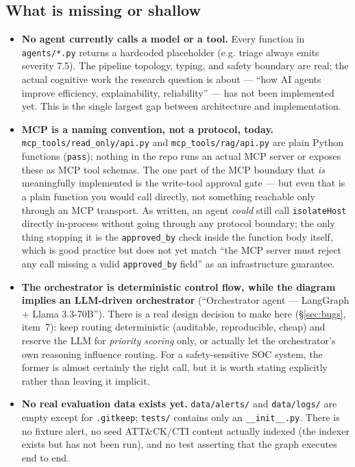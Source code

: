 \documentclass[11pt]{article}
\begin{document}
\subsection{What is missing or shallow}

\begin{itemize}
  \item \textbf{No agent currently calls a model or a tool.} Every function in \texttt{agents/*.py} returns a hardcoded placeholder (e.g. triage always emits severity 7.5). The pipeline topology, typing, and safety boundary are real; the actual cognitive work the research question is about --- ``how AI agents improve efficiency, explainability, reliability'' --- has not been implemented yet. This is the single largest gap between architecture and implementation.
  \item \textbf{MCP is a naming convention, not a protocol, today.} \texttt{mcp\_tools/read\_only/api.py} and \texttt{mcp\_tools/rag/api.py} are plain Python functions (\texttt{pass}); nothing in the repo runs an actual MCP server or exposes these as MCP tool schemas. The one part of the MCP boundary that \emph{is} meaningfully implemented is the write-tool approval gate --- but even that is a plain function you would call directly, not something reachable only through an MCP transport. As written, an agent \emph{could} still call \texttt{isolateHost} directly in-process without going through any protocol boundary; the only thing stopping it is the \texttt{approved\_by} check inside the function body itself, which is good practice but does not yet match ``the MCP server must reject any call missing a valid \texttt{approved\_by} field'' as an infrastructure guarantee.
  \item \textbf{The orchestrator is deterministic control flow, while the diagram implies an LLM-driven orchestrator} (``Orchestrator agent --- LangGraph + Llama 3.3-70B''). There is a real design decision to make here (\S\ref{sec:bugs}, item~7): keep routing deterministic (auditable, reproducible, cheap) and reserve the LLM for \emph{priority scoring} only, or actually let the orchestrator's own reasoning influence routing. For a safety-sensitive SOC system, the former is almost certainly the right call, but it is worth stating explicitly rather than leaving it implicit.
  \item \textbf{No real evaluation data exists yet.} \texttt{data/alerts/} and \texttt{data/logs/} are empty except for \texttt{.gitkeep}; \texttt{tests/} contains only an \texttt{\_\_init\_\_.py}. There is no fixture alert, no seed ATT\&CK/CTI content actually indexed (the indexer exists but has not been run), and no test asserting that the graph executes end to end.

\end{itemize}
\end{document}
